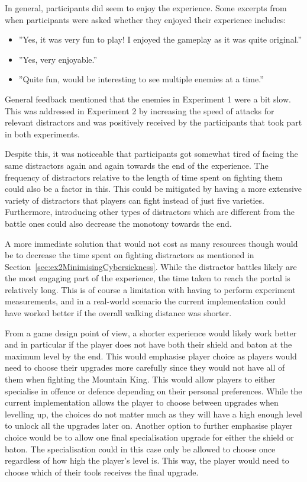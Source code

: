 In general, participants did seem to enjoy the experience. Some excerpts from when participants were asked whether they enjoyed their experience includes:

\begin{itemize}
    \item ''Yes, it was very fun to play! I enjoyed the gameplay as it was quite original.''
    \item ''Yes, very enjoyable.''
    \item ''Quite fun, would be interesting to see multiple enemies at a time.''
\end{itemize}

General feedback mentioned that the enemies in Experiment 1 were a bit slow. This was addressed in Experiment 2 by increasing the speed of attacks for relevant distractors and was positively received by the participants that took part in both experiments. 

Despite this, it was noticeable that participants got somewhat tired of facing the same distractors again and again towards the end of the experience. The frequency of distractors relative to the length of time spent on fighting them could also be a factor in this. This could be mitigated by having a more extensive variety of distractors that players can fight instead of just five varieties. Furthermore, introducing other types of distractors which are different from the battle ones could also decrease the monotony towards the end. 

A more immediate solution that would not cost as many resources though would be to decrease the time spent on fighting distractors as mentioned in Section~\ref{sec:ex2MinimisingCybersickness}. While the distractor battles likely are the most engaging part of the experience, the time taken to reach the portal is relatively long. This is of course a limitation with having to perform experiment measurements, and in a real-world scenario the current implementation could have worked better if the overall walking distance was shorter. 

From a game design point of view, a shorter experience would likely work better and in particular if the player does not have both their shield and baton at the maximum level by the end. This would emphasise player choice as players would need to choose their upgrades more carefully since they would not have all of them when fighting the Mountain King. This would allow players to either specialise in offence or defence depending on their personal preferences. While the current implementation allows the player to choose between upgrades when levelling up, the choices do not matter much as they will have a high enough level to unlock all the upgrades later on. Another option to further emphasise player choice would be to allow one final specialisation upgrade for either the shield or baton. The specialisation could in this case only be allowed to choose once regardless of how high the player's level is. This way, the player would need to choose which of their tools receives the final upgrade.  

